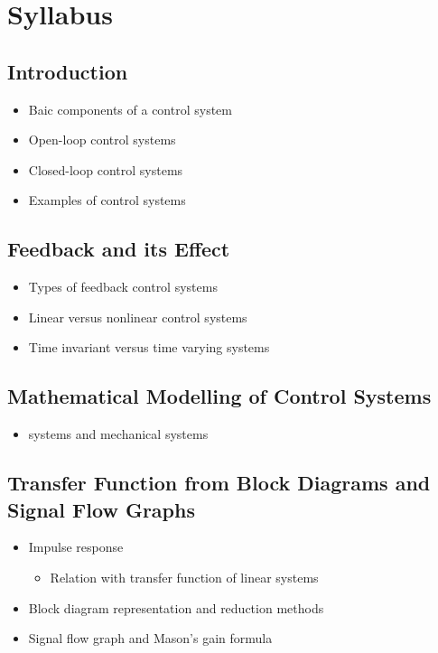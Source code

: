 \documentclass[../course]{subfiles}
\begin{document}
\section{Syllabus}

\subsection{Introduction}

\begin{itemize}

    \item Baic components of a control system
    \item Open-loop control systems
    \item Closed-loop control systems
    \item Examples of control systems

\end{itemize}

\subsection{Feedback and its Effect}

\begin{itemize}

    \item Types of feedback control systems
    \item Linear versus nonlinear control systems
    \item Time invariant versus time varying systems

\end{itemize}

\subsection{Mathematical Modelling of Control Systems}

\begin{itemize}

    \item systems and mechanical systems

\end{itemize}

\subsection{Transfer Function from Block Diagrams and Signal Flow Graphs}

\begin{itemize}

    \item Impulse response

        \begin{itemize}

            \item Relation with transfer function of linear systems

        \end{itemize}

    \item Block diagram representation and reduction methods
    \item Signal flow graph and Mason's gain formula

\end{itemize}
\end{document}
